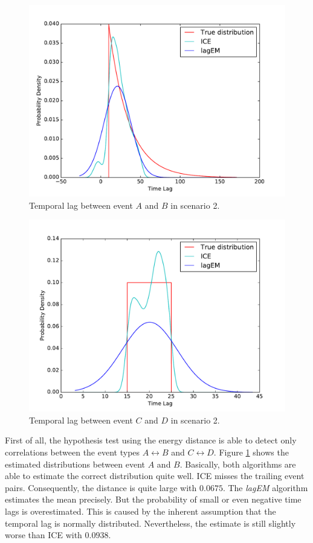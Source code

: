\documentclass[conference]{IEEEtran}
\theoremstyle{examplestyle}
\begin{document}
\begin{figure}[!tb]
	\centering
	\includegraphics[scale=0.4]{images/scenarios/2-AB.pdf}
	\caption{Temporal lag between event \(A\) and \(B\) in scenario 2.}
	\label{fig:scen2-1}	
\end{figure}

\begin{figure}[!tb]
	\centering
	\includegraphics[scale=0.4]{images/scenarios/2-CD.pdf}
	\caption{Temporal lag between event \(C\) and \(D\) in scenario 2.}
	\label{fig:scen2-2}	
\end{figure}

First of all, the hypothesis test using the energy distance is able to detect only correlations between the event types \(A \leftrightarrow B\) and \(C \leftrightarrow D\). Figure \ref{fig:scen2-1} shows the estimated distributions between event \(A\) and \(B\). Basically, both algorithms are able to estimate the correct distribution quite well. \ac{ICE} misses the trailing event pairs. Consequently, the distance is quite large with $0.0675$. The \textit{lagEM} algorithm estimates the mean precisely. But the probability of small or even negative time lags is overestimated. This is caused by the inherent assumption that the temporal lag is normally distributed. Nevertheless, the estimate is still slightly worse than \ac{ICE} with $0.0938$.
\end{document}
